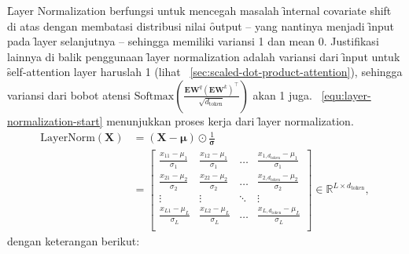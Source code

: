 	\f{Layer Normalization} berfungsi untuk mencegah masalah \f{internal covariate shift} di atas dengan membatasi distribusi nilai \f{output} -- yang nantinya menjadi \f{input} pada \f{layer} selanjutnya -- sehingga memiliki variansi 1 dan mean 0. Justifikasi lainnya di balik penggunaan \f{layer normalization} adalah variansi dari \f{input} untuk \f{self-attention layer} haruslah 1 (lihat \sect~\ref{sec:scaled-dot-product-attention}), sehingga variansi dari bobot atensi $\text{Softmax}(\frac{\mathbf{EW}^q (\mathbf{EW}^k)^{\top}}{\sqrt{d_{\text{token}}}})$ akan 1 juga. \equ~\ref{equ:layer-normalization-start} menunjukkan proses kerja dari \f{layer normalization}.
	\begin{align}
		\label{equ:layer-normalization-start}
		\nonumber \text{LayerNorm}(\mathbf{X}) &= (\mathbf{X}-\bm{\mu})\odot \frac{1}{\bm{\sigma}}\\
		&= \begin{bmatrix}
			\frac{x_{11}-\mu_1}{\sigma_1} & \frac{x_{12}-\mu_1}{\sigma_1} & \dots & \frac{x_{1,d_{\text{token}}}-\mu_1}{\sigma_1} \\
			\frac{x_{21}-\mu_2}{\sigma_2} & \frac{x_{22}-\mu_2}{\sigma_2} & \dots & \frac{x_{2,d_{\text{token}}}-\mu_2}{\sigma_2} \\
			\vdots & \vdots & \ddots & \vdots \\
			\frac{x_{L1}-\mu_L}{\sigma_L} & \frac{x_{L2}-\mu_L}{\sigma_L} & \dots & \frac{x_{L,d_{\text{token}}}-\mu_L}{\sigma_L} \\
		\end{bmatrix} \in \mathbb{R}^{L \times d_{\text{token}}}, 
	\end{align}
	dengan keterangan berikut:
